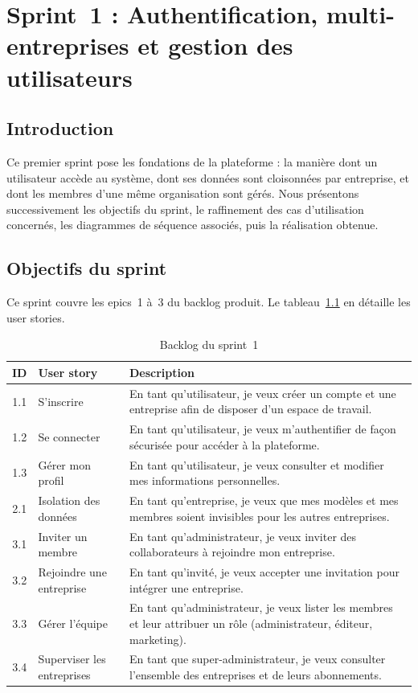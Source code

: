 \chapter{Sprint~1 : Authentification, multi-entreprises et gestion des utilisateurs}
\label{chap:sprint1}

\section*{Introduction}
Ce premier sprint pose les fondations de la plateforme : la manière dont un
utilisateur accède au système, dont ses données sont cloisonnées par
entreprise, et dont les membres d'une même organisation sont gérés. Nous
présentons successivement les objectifs du sprint, le raffinement des cas
d'utilisation concernés, les diagrammes de séquence associés, puis la
réalisation obtenue.

\section{Objectifs du sprint}
Ce sprint couvre les epics~1 à~3 du backlog produit. Le
tableau~\ref{tab:backlog-s1} en détaille les user stories.

\begin{table}[H]
\centering
\caption{Backlog du sprint~1}
\label{tab:backlog-s1}
\small
\begin{tabularx}{\linewidth}{clX}
\toprule
\textbf{ID} & \textbf{User story} & \textbf{Description} \\
\midrule
1.1 & S'inscrire & En tant qu'utilisateur, je veux créer un compte et une entreprise afin de disposer d'un espace de travail. \\
1.2 & Se connecter & En tant qu'utilisateur, je veux m'authentifier de façon sécurisée pour accéder à la plateforme. \\
1.3 & Gérer mon profil & En tant qu'utilisateur, je veux consulter et modifier mes informations personnelles. \\
2.1 & Isolation des données & En tant qu'entreprise, je veux que mes modèles et mes membres soient invisibles pour les autres entreprises. \\
3.1 & Inviter un membre & En tant qu'administrateur, je veux inviter des collaborateurs à rejoindre mon entreprise. \\
3.2 & Rejoindre une entreprise & En tant qu'invité, je veux accepter une invitation pour intégrer une entreprise. \\
3.3 & Gérer l'équipe & En tant qu'administrateur, je veux lister les membres et leur attribuer un rôle (administrateur, éditeur, marketing). \\
3.4 & Superviser les entreprises & En tant que super-administrateur, je veux consulter l'ensemble des entreprises et de leurs abonnements. \\
\bottomrule
\end{tabularx}
\end{table}

